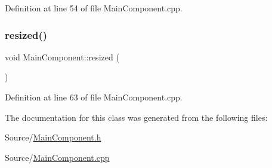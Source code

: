 Definition at line 54 of file Main\+Component.\+cpp.

\mbox{\label{class_main_component_a339148bc43089300e10d5883a0a80726}} 
\subsubsection{\texorpdfstring{resized()}{resized()}}
{\footnotesize\ttfamily void Main\+Component\+::resized (\begin{DoxyParamCaption}{ }\end{DoxyParamCaption})\hspace{0.3cm}{\ttfamily [override]}}



Definition at line 63 of file Main\+Component.\+cpp.



The documentation for this class was generated from the following files\+:\begin{DoxyCompactItemize}
\item 
Source/\mbox{\hyperlink{_main_component_8h}{Main\+Component.\+h}}\item 
Source/\mbox{\hyperlink{_main_component_8cpp}{Main\+Component.\+cpp}}\end{DoxyCompactItemize}
